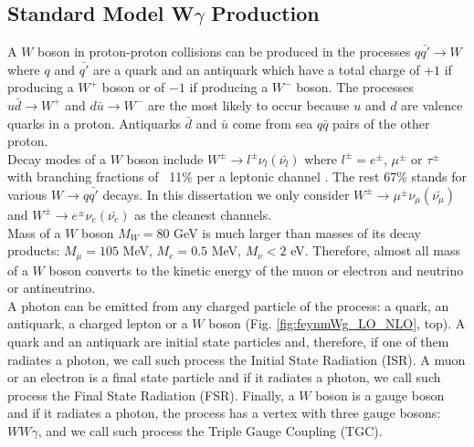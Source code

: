 \subsection{Standard Model W$\gamma$ Production}

A $W$ boson in proton-proton collisions can be produced in the processes $q {\bar{q'}} \rightarrow W$ where $q$ and $\bar{q'}$ are a quark and an antiquark which have a total charge of $+1$ if producing a $W^+$ boson or of $-1$ if producing a $W^-$ boson. The processes $u\bar{d}\rightarrow W^+$ and $d\bar{u}\rightarrow W^-$ are the most likely to occur because $u$ and $d$ are valence quarks in a proton. Antiquarks $\bar{d}$ and $\bar{u}$ come from sea $q\bar{q}$ pairs of the other proton.\\

Decay modes of a $W$ boson include $W^\pm \rightarrow l^\pm \nu_l ({\bar{\nu_l}})$ where $l^\pm=e^\pm$, $\mu^\pm$ or $\tau^\pm$ with branching fractions of ~11\% per a leptonic channel \cite{ref_PDG}. The rest 67\% stands for various $W\rightarrow q\bar{q'}$ decays. In this dissertation we only consider $W^\pm \rightarrow \mu^\pm \nu_\mu ({\bar{\nu_\mu}})$ and $W^\pm \rightarrow e^\pm \nu_e ({\bar{\nu_e}})$ as the cleanest channels.\\

Mass of a $W$ boson $M_W=80$ GeV is much larger than masses of its decay products: $M_\mu=105$ MeV, $M_e=0.5$ MeV, $M_\nu<2$ eV. Therefore, almost all mass of a $W$ boson converts to the kinetic energy of the muon or electron and neutrino or antineutrino.\\

A photon can be emitted from any charged particle of the process: a quark, an antiquark, a charged lepton or a $W$ boson (Fig. \ref{fig:feynmWg_LO_NLO}, top). A quark and an antiquark are initial state particles and, therefore, if one of them radiates a photon, we call such process the Initial State Radiation (ISR). A muon or an electron is a final state particle and if it radiates a photon, we call such process the Final State Radiation (FSR). Finally, a $W$ boson is a gauge boson and if it radiates a photon, the process has a vertex with three gauge bosons: $WW\gamma$, and we call such process the Triple Gauge Coupling (TGC).\\

